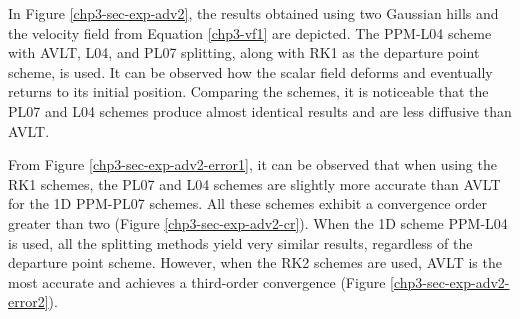 In Figure \ref{chp3-sec-exp-adv2}, the results obtained using two Gaussian hills and
the velocity field from Equation \eqref{chp3-vf1} are depicted.
The PPM-L04 scheme with AVLT, L04, and PL07 splitting, along with RK1 as 
the departure point scheme, is used.
It can be observed how the scalar field deforms and eventually returns to its initial position.
Comparing the schemes, it is noticeable that the PL07 and L04 schemes produce almost identical
results and are less diffusive than AVLT.

From Figure \ref{chp3-sec-exp-adv2-error1}, it can be observed that when using the RK1 schemes,
the PL07 and L04 schemes are slightly more accurate than AVLT for the 1D PPM-PL07 schemes.
All these schemes exhibit a convergence order greater than two (Figure \ref{chp3-sec-exp-adv2-cr}).
When the 1D scheme PPM-L04 is used, all the splitting methods yield very similar results, regardless
of the departure point scheme.
However, when the RK2 schemes are used, AVLT is the most accurate and achieves a
third-order convergence (Figure \ref{chp3-sec-exp-adv2-error2}).
